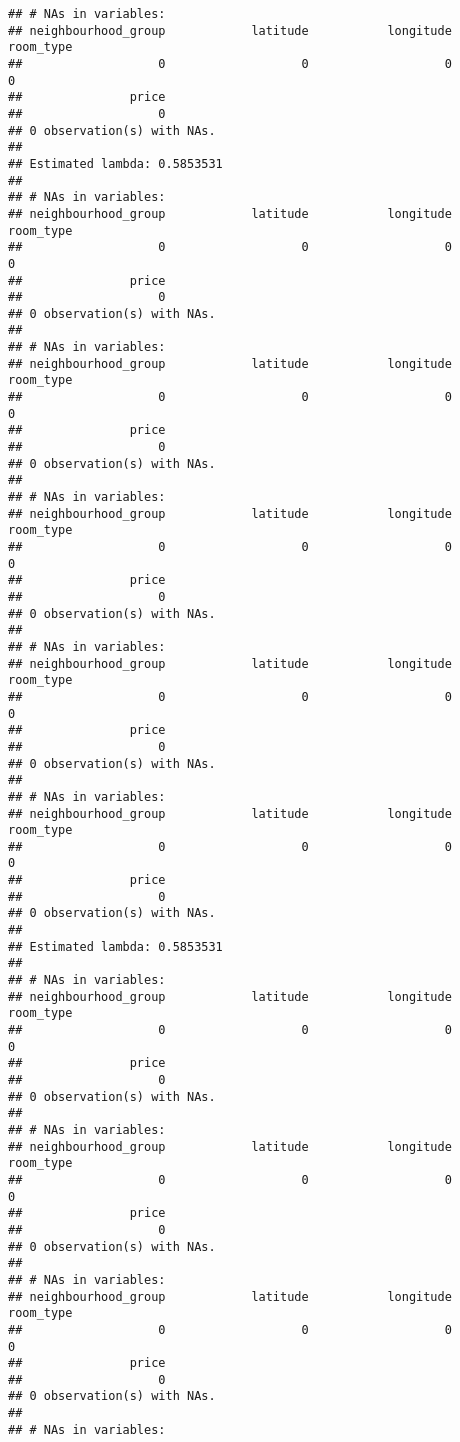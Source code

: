 \documentclass[
]{article}
\begin{document}
\begin{verbatim}
## # NAs in variables:
## neighbourhood_group            latitude           longitude           room_type 
##                   0                   0                   0                   0 
##               price 
##                   0 
## 0 observation(s) with NAs.
## 
## Estimated lambda: 0.5853531 
## 
## # NAs in variables:
## neighbourhood_group            latitude           longitude           room_type 
##                   0                   0                   0                   0 
##               price 
##                   0 
## 0 observation(s) with NAs.
## 
## # NAs in variables:
## neighbourhood_group            latitude           longitude           room_type 
##                   0                   0                   0                   0 
##               price 
##                   0 
## 0 observation(s) with NAs.
## 
## # NAs in variables:
## neighbourhood_group            latitude           longitude           room_type 
##                   0                   0                   0                   0 
##               price 
##                   0 
## 0 observation(s) with NAs.
## 
## # NAs in variables:
## neighbourhood_group            latitude           longitude           room_type 
##                   0                   0                   0                   0 
##               price 
##                   0 
## 0 observation(s) with NAs.
## 
## # NAs in variables:
## neighbourhood_group            latitude           longitude           room_type 
##                   0                   0                   0                   0 
##               price 
##                   0 
## 0 observation(s) with NAs.
## 
## Estimated lambda: 0.5853531 
## 
## # NAs in variables:
## neighbourhood_group            latitude           longitude           room_type 
##                   0                   0                   0                   0 
##               price 
##                   0 
## 0 observation(s) with NAs.
## 
## # NAs in variables:
## neighbourhood_group            latitude           longitude           room_type 
##                   0                   0                   0                   0 
##               price 
##                   0 
## 0 observation(s) with NAs.
## 
## # NAs in variables:
## neighbourhood_group            latitude           longitude           room_type 
##                   0                   0                   0                   0 
##               price 
##                   0 
## 0 observation(s) with NAs.
## 
## # NAs in variables:

\end{verbatim}
\end{document}
